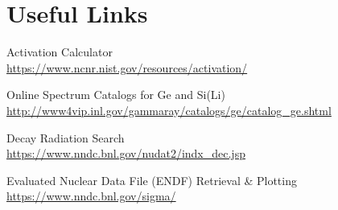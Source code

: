 \documentclass[a4paper, 11pt]{article}
\begin{document}
\section*{Useful Links}

Activation Calculator \\
\href{https://www.ncnr.nist.gov/resources/activation/}{https://www.ncnr.nist.gov/resources/activation/}

\vspace{0.05\textheight}
\noindent
Online Spectrum Catalogs for Ge and Si(Li) \\
\href{http://www4vip.inl.gov/gammaray/catalogs/ge/catalog\_ge.shtml}{http://www4vip.inl.gov/gammaray/catalogs/ge/catalog\_ge.shtml}

\vspace{0.05\textheight}
\noindent
Decay Radiation Search \\
\href{https://www.nndc.bnl.gov/nudat2/indx\_dec.jsp}{https://www.nndc.bnl.gov/nudat2/indx\_dec.jsp}

\vspace{0.05\textheight}
\noindent
Evaluated Nuclear Data File (ENDF) Retrieval \& Plotting \\
\href{https://www.nndc.bnl.gov/sigma/}{https://www.nndc.bnl.gov/sigma/}



\end{document}
